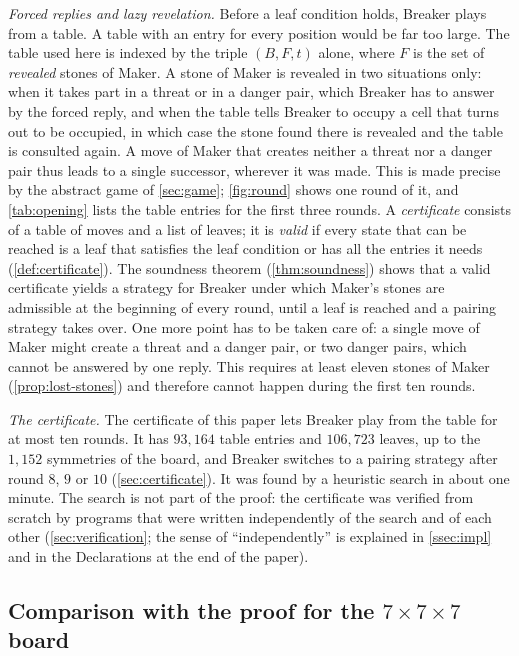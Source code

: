 \emph{Forced replies and lazy revelation.} Before a leaf condition holds, Breaker plays from a table.
A table with an entry for every position would be far too large. The table used here is indexed by the
triple $(B,F,t)$ alone, where $F$ is the set of \emph{revealed} stones of Maker. A stone of Maker is
revealed in two situations only: when it takes part in a threat or in a danger pair, which Breaker has
to answer by the forced reply, and when the table tells Breaker to occupy a cell that turns out to be
occupied, in which case the stone found there is revealed and the table is consulted again. A move of
Maker that creates neither a threat nor a danger pair thus leads to a single successor, wherever it was
made. This is made precise by the abstract game of \cref{sec:game}; \cref{fig:round} shows one round
of it, and \cref{tab:opening} lists the table entries for the first three rounds. A \emph{certificate}
consists of a
table of moves and a list of leaves; it is \emph{valid} if every state that can be reached is a leaf
that satisfies the leaf condition or has all the entries it needs (\cref{def:certificate}). The
soundness theorem
(\cref{thm:soundness}) shows that a valid certificate yields a strategy for Breaker under which Maker's
stones are admissible at the beginning of every round, until a leaf is reached and a pairing strategy
takes over. One more point has to be taken care of: a single move of Maker might create a threat and a
danger pair, or two danger pairs, which cannot be answered by one reply. This requires at least eleven
stones of Maker (\cref{prop:lost-stones}) and therefore cannot happen during the first ten rounds.

\emph{The certificate.} The certificate of this paper lets Breaker play from the table for at most ten
rounds. It has $93{,}164$ table entries and $106{,}723$ leaves, up to the $1{,}152$ symmetries of the
board, and Breaker switches to a pairing strategy after round $8$, $9$ or $10$ (\cref{sec:certificate}).
It was found by a heuristic search in about one minute. The search is not part of the proof: the
certificate was verified from scratch by programs that were written independently of the search and of
each other (\cref{sec:verification}; the sense of ``independently'' is explained in
\cref{ssec:impl} and in the Declarations at the end of the paper).

\subsection{Comparison with the proof for the \texorpdfstring{$7\times7\times7$}{7x7x7} board}
\label{ssec:intro-seven}

